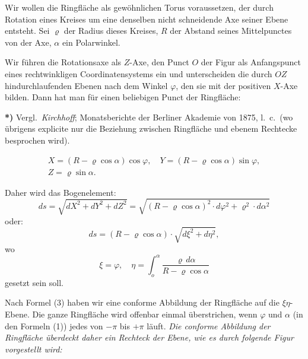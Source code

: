 \documentclass{article}
\begin{document}

Wir wollen die Ringfläche als gewöhnlichen Torus voraussetzen, der durch Rotation eines Kreises um eine denselben nicht schneidende Axe seiner Ebene entsteht. Sei $\varrho$ der Radius dieses Kreises, $R$ der Abstand seines Mittelpunctes von der Axe, $\alpha$ ein Polarwinkel.

Wir führen die Rotationsaxe als $Z$-Axe, den Punct $O$ der Figur als Anfangspunct eines rechtwinkligen Coordinatensystems ein und unterscheiden die durch $OZ$ hindurchlaufenden Ebenen nach dem Winkel $\varphi$, den sie mit der positiven $X$-Axe bilden. Dann hat man für einen beliebigen Punct der Ringfläche:

\textbf{*)} Vergl.\ \emph{Kirchhoff}; Monatsberichte der Berliner Akademie von 1875, l.\ c.\ (wo übrigens explicite nur die Beziehung zwischen Ringfläche und ebenem Rechtecke besprochen wird).

\[ \begin{gathered} X = (R - \varrho \cos \alpha) \cos \varphi, \quad Y = (R - \varrho \cos \alpha) \sin \varphi, \\ Z = \varrho \sin \alpha. \end{gathered} \tag{1} \]

Daher wird das Bogenelement:
\[ ds = \sqrt{dX^{2} + dY^{2} + dZ^{2}} = \sqrt{(R - \varrho \cos \alpha)^{2} \cdot d\varphi^{2} + \varrho^{2} \cdot d\alpha^{2}} \tag{2} \]
oder:
\[ ds = (R - \varrho \cos \alpha) \cdot \sqrt{d\xi^{2} + d\eta^{2}}, \tag{3} \]
wo
\[ \xi = \varphi, \quad \eta = \int_{o}^{\alpha} \frac{\varrho\,d\alpha}{R - \varrho \cos \alpha} \tag{4} \]
gesetzt sein soll.

Nach Formel (3) haben wir eine conforme Abbildung der Ringfläche auf die $\xi\eta$-Ebene. Die ganze Ringfläche wird offenbar einmal überstrichen, wenn $\varphi$ und $\alpha$ (in den Formeln (1)) jedes von $-\pi$ bis $+\pi$ läuft. \emph{Die conforme Abbildung der Ringfläche überdeckt daher ein Rechteck der Ebene, wie es durch folgende Figur vorgestellt wird:}

\end{document}
